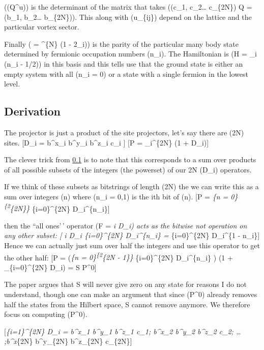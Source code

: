 ((Q\^{}u)) is the determinant of the matrix that takes
((c\_1, c\_2\ldots{} c\_\{2N\}) Q = (b\_1, b\_2\ldots{} b\_\{2N\})).
This along with (\prod u\_\{ij\}) depend on the lattice and the
particular vortex sector.

Finally (\hat{\pi} = \^{}\{N\} (1 - 2\_i)) is the parity
of the particular many body state determined by fermionic occupation
numbers (n\_i). The Hamiltonian is (H = \sum \epsilon\_i (n\_i - 1/2))
in this basis and this tells use that the ground state is either an
empty system with all (n\_i = 0) or a state with a single fermion in the
lowest level.

\subsection{Derivation}

The projector is just a product of the site projectors, let's say there
are (2N) sites. {[}D\_i = b\^{}x\_i b\^{}y\_i b\^{}z\_i c\_i {]} {[}P =
\prod\_i\^{}\{2N\} (1 + D\_i){]}

The clever trick from \ref{} is to note that this corresponds to a sum
over products of all possible subsets of the integers (the powerset) of
our 2N (D\_i) operators.

If we think of these subsets as bitstrings of length (2N) the we can
write this as a sum over integers (n) where (n\_i = 0,1) is the ith bit
of (n). {[}P = \sum\emph{\{n = 0\}\textsuperscript{\{2}\{2N\}\}
\prod}\{i=0\}\^{}\{2N\} D\_i\^{}\{n\_i\}{]}

then the ``all ones'\,' operator (F = \prod\emph{i D\_i) acts as the
bitwise not operation on any other subset: {[} \prod\emph{i D\_i
\prod}\{i=0\}\^{}\{2N\} D\_i\^{}\{n\_i\} = \prod}\{i=0\}\^{}\{2N\}
D\_i\^{}\{1 - n\_i\}{]} Hence we can actually just sum over half the
integers and use this operator to get the other half: {[}P =
\left(\sum\emph{\{n = 0\}\textsuperscript{\{2}\{2N - 1\}\}
\prod}\{i=0\}\^{}\{2N\} D\_i\^{}\{n\_i\} \right) (1 +
\prod\_\{i=0\}\^{}\{2N\} D\_i) = S P\^{}0{]}

The paper argues that S will never give zero on any state for reasons I
do not understand, though one can make an argument that since (P\^{}0)
already removes half the states from the Hilbert space, S cannot remove
anymore. We therefore focus on computing (P\^{}0).

{[}\prod\emph{\{i=1\}\^{}\{2N\} D\_i = b\^{}x\_1 b\^{}y\_1 b\^{}z\_1
c\_1; b\^{}x\_2 b\^{}y\_2 b\^{}z\_2 c\_2; \ldots{} ;b\^{}x}\{2N\}
b\^{}y\_\{2N\} b\^{}z\_\{2N\} c\_\{2N\}{]}

